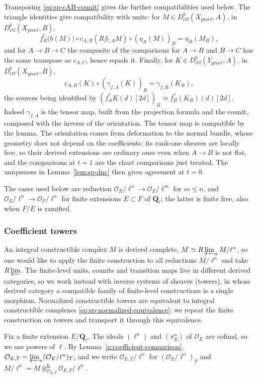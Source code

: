 \documentclass[11pt,a4paper]{article}
\numberwithin{equation}{section}
\theoremstyle{definition}
\theoremstyle{remark}
\newcommand{\Ql}{\mathbf Q_\ell}
\newcommand{\proet}{\mathrm{pro}\acute{e}t}
\newcommand{\Dctf}{D^b_{\mathrm{ctf}}}
\begin{document}
Transposing \eqref{eq:sp-cAB-counit} gives the further compatibilities
used below. The triangle identities give compatibility with units: for
$M\in\Dctf(X_{\proet},A)$, in $\Dctf(X_{\proet},B)$,
\[
 f_B^!\bigl(b(M)\bigr)\circ c_{A,B}(Rf_{!,A}M)\circ (\eta_A(M))_B
       =\eta_B(M_B),
\]
and for $A\to B\to C$ the composite of the comparisons for $A\to B$ and
$B\to C$ has the same transpose as $c_{A,C}$, hence equals it. Finally,
for $K\in\Dctf(Y_{\proet},A)$, in $\Dctf(X_{\proet},B)$,
\begin{equation}\label{eq:sp-scalar-gamma}
 c_{A,B}(K)\circ (\gamma_{f,A}(K))_B
       =\gamma_{f,B}(K_B),
\end{equation}
the sources being identified by
$(f_A^*K(d)[2d])_B\simeq f_B^*(K_B)(d)[2d]$. Indeed $\gamma_{f,A}$ is
the tensor map, built from the projection formula and the counit,
composed with the inverse of the orientation. The tensor map is
compatible by the lemma. The orientation comes from deformation to the
normal bundle, whose geometry does not depend on the coefficients; its
rank-one sheaves are locally free, so their derived extensions are
ordinary ones even when $A\to B$ is not flat, and the comparisons at
$t=1$ are the chart comparisons just treated. The uniqueness in
Lemma~\ref{lem:sp-dnc} then gives agreement at $t=0$.

The cases used below are reduction
$\mathcal O_E/\ell^n\to\mathcal O_E/\ell^m$ for $m\leq n$, and
$\mathcal O_E/\ell^n\to\mathcal O_F/\ell^n$ for finite extensions
$E\subset F$ of $\Ql$; the latter is finite free, also when $F/E$ is
ramified.

\subsubsection{Coefficient towers}

An integral constructible complex $M$ is derived complete,
$M\simeq R\varprojlim_n M/\ell^n$, so one would like to apply the finite
construction to all reductions $M/\ell^n$ and take $R\varprojlim$. The
finite-level units, counits and transition maps live in different
derived categories, so we work instead with inverse systems of sheaves
(towers), in whose derived category a compatible family of finite-level
constructions is a single morphism. Normalized constructible towers are
equivalent to integral constructible complexes
\eqref{eq:sp-normalized-equivalence}; we repeat the finite construction
on towers and transport it through this equivalence.

Fix a finite extension $E/\Ql$. The ideals $(\ell^n)$ and $(\pi_E^n)$
of $\mathcal O_E$ are cofinal, so we use powers of $\ell$. By
Lemma~\ref{n:coefficient-comparison},
$\mathcal O_{E,T}=\varprojlim_n(\mathcal O_E/\ell^n)_T$, and we write
$\mathcal O_{E,T}/\ell^n$ for $(\mathcal O_E/\ell^n)_T$ and
$M/\ell^n=M\otimes^{\mathbf L}_{\mathcal O_{E,T}}\mathcal O_{E,T}/\ell^n$.
\end{document}
